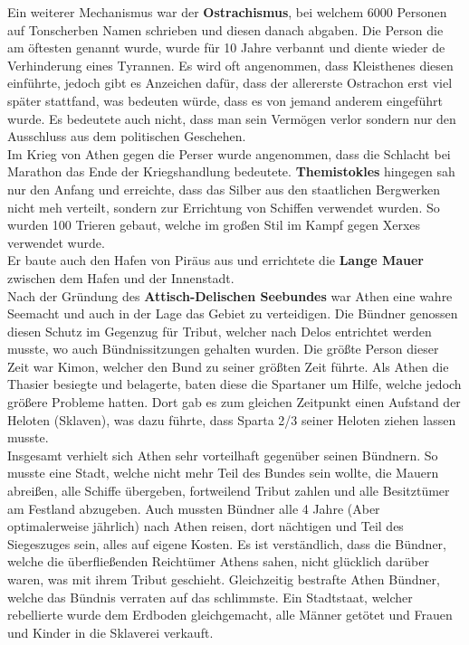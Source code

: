 \documentclass{article}
\begin{document}
	Ein weiterer Mechanismus war der \textbf{Ostrachismus}, bei welchem 6000 Personen auf Tonscherben Namen schrieben und diesen danach abgaben. Die Person die am öftesten genannt wurde, wurde für 10 Jahre verbannt und diente wieder de Verhinderung eines Tyrannen. Es wird oft angenommen, dass Kleisthenes diesen einführte, jedoch gibt es Anzeichen dafür, dass der allererste Ostrachon erst viel später stattfand, was bedeuten würde, dass es von jemand anderem eingeführt wurde. Es bedeutete auch nicht, dass man sein Vermögen verlor sondern nur den Ausschluss aus dem politischen Geschehen. \\
	Im Krieg von Athen gegen die Perser wurde angenommen, dass die Schlacht bei Marathon das Ende der Kriegshandlung bedeutete. \textbf{Themistokles} hingegen sah nur den Anfang und erreichte, dass das Silber aus den staatlichen Bergwerken nicht meh verteilt, sondern zur Errichtung von Schiffen verwendet wurden. So wurden 100 Trieren gebaut, welche im großen Stil im Kampf gegen Xerxes verwendet wurde. \\
	Er baute auch den Hafen von Piräus aus und errichtete die \textbf{Lange Mauer} zwischen dem Hafen und der Innenstadt. \\
	Nach der Gründung des \textbf{Attisch-Delischen Seebundes} war Athen eine wahre Seemacht und auch in der Lage das Gebiet zu verteidigen. Die Bündner genossen diesen Schutz im Gegenzug für Tribut, welcher nach Delos entrichtet werden musste, wo auch Bündnissitzungen gehalten wurden. Die größte Person dieser Zeit war Kimon, welcher den Bund zu seiner größten Zeit führte. Als Athen die Thasier besiegte und belagerte, baten diese die Spartaner um Hilfe, welche jedoch größere Probleme hatten. Dort gab es zum gleichen Zeitpunkt einen Aufstand der Heloten (Sklaven), was dazu führte, dass Sparta 2/3 seiner Heloten ziehen lassen musste.\\
	Insgesamt verhielt sich Athen sehr vorteilhaft gegenüber seinen Bündnern. So musste eine Stadt, welche nicht mehr Teil des Bundes sein wollte, die Mauern abreißen, alle Schiffe übergeben, fortweilend Tribut zahlen und alle Besitztümer am Festland abzugeben. Auch mussten Bündner alle 4 Jahre (Aber optimalerweise jährlich) nach Athen reisen, dort nächtigen und Teil des Siegeszuges sein, alles auf eigene Kosten. Es ist verständlich, dass die Bündner, welche die überfließenden Reichtümer Athens sahen, nicht glücklich darüber waren, was mit ihrem Tribut geschieht. Gleichzeitig bestrafte Athen Bündner, welche das Bündnis verraten auf das schlimmste. Ein Stadtstaat, welcher rebellierte wurde dem Erdboden gleichgemacht, alle Männer getötet und Frauen und Kinder in die Sklaverei verkauft. \\
\end{document}
